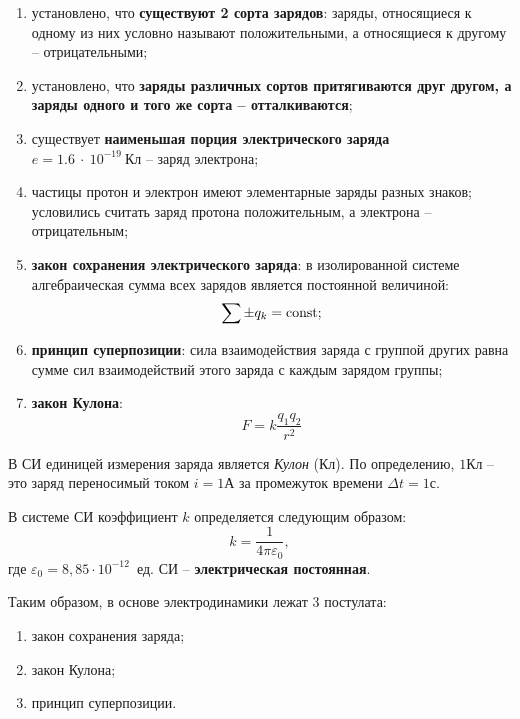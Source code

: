     \begin{enumerate}

        \item установлено, что \textbf{существуют 2 сорта зарядов}: заряды,
        относящиеся к одному из них условно называют положительными, а
        относящиеся к другому -- отрицательными;

        \item установлено, что \textbf{заряды различных сортов притягиваются
        друг другом, а заряды одного и того же сорта -- отталкиваются};

        \item существует \textbf{наименьшая порция электрического заряда}\\
        \(e = 1.6~\cdot~10^{-19}~\text{Кл}\) -- заряд электрона;

        \item частицы протон и электрон имеют элементарные заряды разных
        знаков; условились считать заряд протона положительным, а электрона --
        отрицательным;

        \item \textbf{закон сохранения электрического заряда}: в изолированной
        системе алгебраическая сумма всех зарядов является постоянной
        величиной:
        \[
            \sum\pm q_k = \mathrm{const};
        \]

        \item \textbf{принцип суперпозиции}: сила взаимодействия заряда с
        группой других равна сумме сил взаимодействий этого заряда с каждым
        зарядом группы;

        \item \textbf{закон Кулона}:
        \begin{equation}
            F = k\frac{q_1q_2}{r^2} \label{eq1:1}
        \end{equation}

    \end{enumerate}


    В СИ единицей измерения заряда является \textit{Кулон} (Кл). По
    определению, \( 1\text{Кл} \) -- это заряд переносимый током
    \( i = 1\text{А} \) за промежуток времени \( \Delta t = 1\text{с} \).

    В системе СИ коэффициент \( k \) определяется следующим образом:
    \[
        k = \frac{1}{4\pi\varepsilon_0},
    \]
    где \( \varepsilon_0 = 8,85\cdot10^{-12} \)~ед. СИ --
    \textbf{электрическая постоянная}.

    Таким образом, в основе электродинамики лежат 3 постулата:
    \begin{enumerate}
        \item закон сохранения заряда;
        \item закон Кулона;
        \item принцип суперпозиции.
    \end{enumerate}



